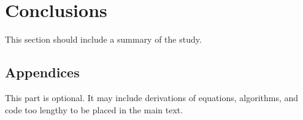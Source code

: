 \documentclass[12pt]{report}
\begin{document}
\chapter{Conclusions}
This section should include a summary of the study.




\begin{appendices}
\setcounter{secnumdepth}{-1}
\chapter{Appendices}
This part is optional. It may include derivations of equations, algorithms, and code too lengthy to be placed in the main text.
\end{appendices}
\end{document}
